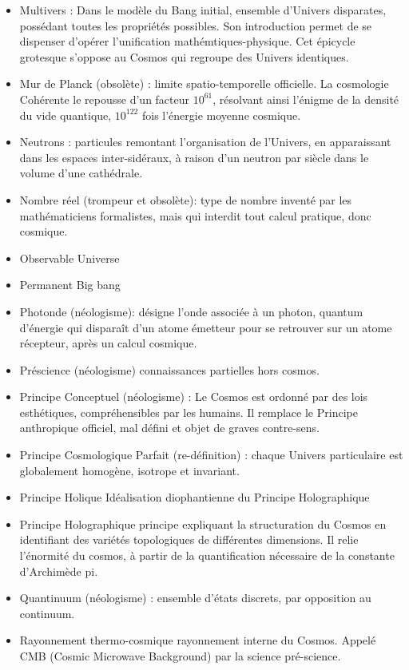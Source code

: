\documentclass[a4paper,12pt]{article}
\begin{document}
\begin{appendix}
\begin{itemize}
\item Multivers : Dans le modèle du Bang initial, ensemble d'Univers disparates, possédant toutes les propriétés possibles. Son introduction permet de se dispenser d'opérer l'unification mathémtiques-physique. Cet épicycle grotesque s'oppose au Cosmos qui regroupe des Univers identiques. 


\item Mur de Planck (obsolète) : limite spatio-temporelle officielle. La cosmologie Cohérente le repousse d’un facteur $10^{61}$, résolvant ainsi l’énigme de la densité du vide quantique, $10^{122}$ fois l’énergie moyenne cosmique.
\item Neutrons : particules remontant l’organisation de l’Univers, en apparaissant dans les espaces inter-sidéraux, à raison d’un neutron par siècle dans le volume d’une cathédrale.
\item Nombre réel (trompeur et obsolète): type de nombre inventé par les mathématiciens formalistes, mais qui interdit tout calcul pratique, donc cosmique.
\item Observable Universe
\item Permanent Big bang
\item Photonde (néologisme): désigne l’onde associée à un photon, quantum d’énergie qui disparaît d’un atome émetteur pour se retrouver sur un atome récepteur, après un calcul cosmique.
\item Préscience (néologisme) connaissances partielles hors cosmos.
\item Principe Conceptuel (néologisme) : Le Cosmos est ordonné par des lois esthétiques, compréhensibles par les humains. Il remplace le Principe anthropique officiel, mal défini et objet de graves contre-sens.
\item Principe Cosmologique Parfait (re-définition) : chaque Univers particulaire est globalement homogène, isotrope et invariant.
\item Principe Holique Idéalisation diophantienne du Principe Holographique
\item Principe Holographique principe expliquant la structuration du Cosmos en identifiant des variétés topologiques de différentes dimensions. Il relie l’énormité du cosmos, à partir de la quantification nécessaire de la constante d’Archimède pi.
\item Quantinuum (néologisme) : ensemble d’états discrets, par opposition au continuum.
\item Rayonnement thermo-cosmique rayonnement interne du Cosmos. Appelé CMB (Cosmic Microwave Background) par la science pré-science.

\end{itemize}
\end{appendix}
\end{document}
